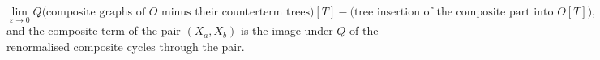 \begin{definition}
\[
\lim_{\varepsilon\to0}Q\big(\text{composite graphs of }O\text{ minus their counterterm trees}\big)[T]-\big(\text{tree insertion of the composite part into }O[T]\big),
\]
and the composite term of the pair $(X_a,X_b)$ is the image under $Q$ of the renormalised composite cycles through the pair.
\end{definition}
